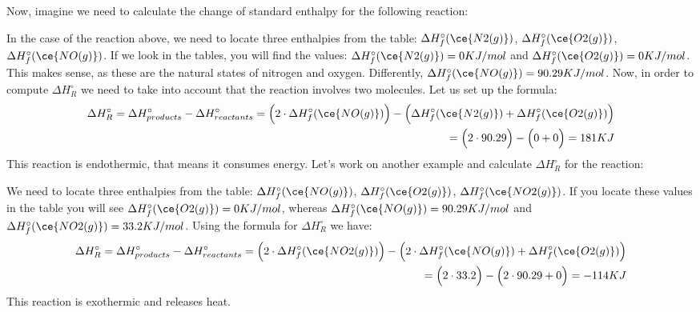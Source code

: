\documentclass[main.tex]{subfiles}
\begin{document}
\begin{description}
Now, imagine we need to calculate the change of standard enthalpy for the following reaction:
\begin{center}\end{center}
In the case of the reaction above, we need to locate three enthalpies from the table: $\Delta H_f^{\circ}(\ce{N2(g)})$, $\Delta H_f^{\circ}(\ce{O2(g)})$, $\Delta H_f^{\circ}(\ce{NO(g)})$. If we look in the tables, you will find the values: $\Delta H_f^{\circ}(\ce{N2(g)})=0KJ/mol$ and $\Delta H_f^{\circ}(\ce{O2(g)})=0KJ/mol$. This makes sense, as these are the natural states of nitrogen and oxygen. Differently, $\Delta H_f^{\circ}(\ce{NO(g)})=90.29KJ/mol$. Now, in order to compute $\Delta H^{\circ}_R$ we need to take into account that the reaction involves two  molecules. Let us set up the formula:
\begin{equation*}\begin{split}
  \Delta H^{\circ}_R= \Delta H^{\circ}_{products}-\Delta H^{\circ}_{reactants}= \Big(2\cdot \Delta H_f^{\circ}(\ce{NO(g)})    \Big)-\Big(\Delta H_f^{\circ}(\ce{N2(g)})+ \Delta H_f^{\circ}(\ce{O2(g)}) \Big)      \\
  =     \Big(2\cdot90.29  \Big)-\Big( 0+0 \Big)= 181KJ
\end{split}\end{equation*}
This reaction is endothermic, that means it consumes energy.
Let's work on another example and calculate $\Delta H^{\circ}_R$ for the reaction:
\begin{center}\end{center}
We need to locate three enthalpies from the table: $\Delta H_f^{\circ}(\ce{NO(g)})$, $\Delta H_f^{\circ}(\ce{O2(g)})$, $\Delta H_f^{\circ}(\ce{NO2(g)})$. If you locate these values in the table you will see $\Delta H_f^{\circ}(\ce{O2(g)})=0KJ/mol$, whereas $\Delta H_f^{\circ}(\ce{NO(g)})=90.29KJ/mol$ and $\Delta H_f^{\circ}(\ce{NO2(g)})=33.2KJ/mol$. Using the formula for $\Delta H^{\circ}_R$ we have:
\begin{equation*}\begin{split}
  \Delta H^{\circ}_R= \Delta H^{\circ}_{products}-\Delta H^{\circ}_{reactants}= \Big(2\cdot \Delta H_f^{\circ}(\ce{NO2(g)})    \Big)-\Big(2\cdot \Delta H_f^{\circ}(\ce{NO(g)})+ \Delta H_f^{\circ}(\ce{O2(g)}) \Big)      \\
  =     \Big(2\cdot 33.2  \Big)-\Big( 2\cdot 90.29+0 \Big)= -114KJ
\end{split}\end{equation*}
This reaction is exothermic and releases heat.


\end{description}
\end{document}
